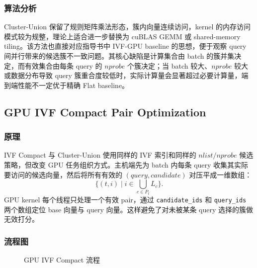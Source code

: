 \documentclass[a4paper]{article}
\begin{document}
\subsubsection{算法分析}

Cluster-Union 保留了规则矩阵乘法形态，簇内向量连续访问，kernel 的内存访问模式较为规整，理论上适合进一步替换为 cuBLAS GEMM 或 shared-memory tiling。该方法也直接对应指导书中 IVF-GPU baseline 的思想，便于观察 query 间并行带来的候选簇不一致问题。其核心缺陷是计算集合由 batch 的簇并集决定，而有效集合由每条 query 的 $nprobe$ 个簇决定；当 batch 较大、$nprobe$ 较大或数据分布导致 query 簇重合度较低时，实际计算量会显著超过必要计算量，端到端性能不一定优于精确 Flat baseline。

\subsection{GPU IVF Compact Pair Optimization}

\subsubsection{原理}

IVF Compact 与 Cluster-Union 使用同样的 IVF 索引和同样的 $nlist/nprobe$ 候选策略，但改变 GPU 任务组织方式。主机端先为 batch 内每条 query 收集其实际要访问的候选向量，然后将所有有效的 $(query,candidate)$ 对压平成一维数组：
\[
  \{(t,i)\mid i\in \bigcup_{c\in P_t} L_c\}.
\]
GPU kernel 每个线程只处理一个有效 pair，通过 \texttt{candidate\_ids} 和 \texttt{query\_ids} 两个数组定位 base 向量与 query 向量。这样避免了对未被某条 query 选择的簇做无效打分。

\subsubsection{流程图}

\begin{figure}[H]
\centering
{}
\caption{GPU IVF Compact 流程}
\end{figure}
\end{document}
